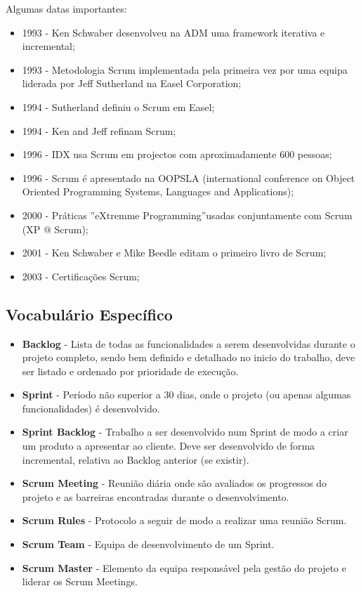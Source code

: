 Algumas datas importantes:

\begin{itemize}
\item 1993 - Ken Schwaber desenvolveu na ADM uma framework iterativa e incremental;
\item 1993 - Metodologia Scrum implementada pela primeira vez por uma equipa
liderada por Jeff Sutherland na Easel Corporation;
\item 1994 - Sutherland definiu o Scrum em Easel;
\item 1994 - Ken and Jeff refinam Scrum;
\item 1996 - IDX usa Scrum em projectos com aproximadamente 600 pessoas;
\item 1996 - Scrum é apresentado na OOPSLA (international conference on Object Oriented Programming Systems, Languages and Applications);
\item 2000 - Práticas ”eXtremme Programming”usadas conjuntamente com Scrum (XP @ Scrum);
\item 2001 - Ken Schwaber e Mike Beedle editam o primeiro livro de Scrum;
\item 2003 - Certificações Scrum;
\end{itemize}

\newpage

\subsection{Vocabulário Específico}

\begin{itemize}
    \item \textbf{Backlog} - Lista de todas as funcionalidades a serem desenvolvidas durante o projeto completo, sendo bem definido e detalhado no inicio do trabalho, deve ser listado e ordenado por prioridade de execução.
    \item \textbf{Sprint} - Período não superior a 30 dias, onde o projeto (ou apenas algumas   funcionalidades) é desenvolvido.
    
    \item \textbf{Sprint Backlog} - Trabalho a ser desenvolvido num Sprint de modo a criar um produto a apresentar ao cliente. Deve ser desenvolvido de forma incremental, relativa ao Backlog anterior (se existir).
    
    \item \textbf{Scrum Meeting} - Reunião diária onde são avaliados os progressos do projeto e as barreiras encontradas durante o desenvolvimento.
    
    \item \textbf{Scrum Rules} - Protocolo a seguir de modo a realizar uma reunião Scrum. 
    
    \item \textbf{Scrum Team} - Equipa de desenvolvimento de um Sprint.

    \item \textbf{Scrum Master} - Elemento da equipa responsável pela gestão do projeto e liderar os Scrum Meetings.
\end{itemize}

